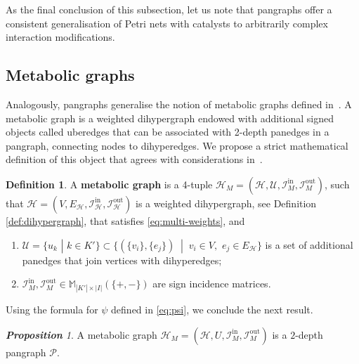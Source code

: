 \documentclass[a4paper,12pt]{article}
\theoremstyle{definition}
\newtheorem{definition}{Definition}
\theoremstyle{remark}
\newcommand{\mH}{\mathcal{H}}
\newcommand{\mP}{\mathcal{P}}
\newcommand{\EH}{E_{\mathcal{H}}}
\newcommand{\tin}{\mathrm{in}}
\newcommand{\out}{\mathrm{out}}
\newcommand{\inci}{\mathcal{I}^{\tin}}
\newcommand{\inco}{\mathcal{I}^{\out}}
\newtheorem{prop}{\small\bf Proposition}
\begin{document}
As the final conclusion of this subsection, let us note that pangraphs offer a consistent generalisation of Petri nets with catalysts to arbitrarily complex interaction modifications.


\subsection{Metabolic graphs}
Analogously, pangraphs generalise the notion of metabolic graphs defined in~\cite{Metabolic_graphs_McQuade}. A metabolic graph is a weighted dihypergraph endowed with additional signed objects called uberedges that can be associated with 2-depth panedges in a pangraph, connecting nodes to dihyperedges. We propose a strict mathematical definition of this object that agrees with considerations in~\cite{Metabolic_graphs_McQuade}.

\begin{definition}
    A \textbf{metabolic graph} is a 4-tuple $\mathcal{H}_{M}=(\mathcal{H},\mathcal{U}, \inci_M,\inco_M)$, such that $\mathcal{H}=(V,\EH,\inci_\mH,\inco_\mH)$ is a weighted dihypergraph, see Definition \ref{def:dihypergraph}, that satisfies \eqref{eq:multi-weights}, and
    \begin{enumerate}
  \item  $\mathcal{U}=\{u_k\,\,|\,\,k\in K'\}\subset \{(\{v_i\},\{e_j\})\;\;|\;\;v_i\in V,\,\,e_j\in E_{\mH}\}$ is a set of additional panedges that join vertices with dihyperedges;
  
    \item  $\inci_M,\inco_M\in \mathbb{M}_{|K'|\times |I|}(\{+,-\})$ are sign incidence matrices.
        \end{enumerate}
\end{definition}

Using the formula for $\psi$ defined in \eqref{eq:psi}, we conclude the next result. 
\begin{prop}
    A metabolic graph $\mathcal{H}_{M}=(\mathcal{H},U, \inci_M,\inco_M)$ is a $2$-depth pangraph $\mP$.
\end{prop}
\end{document}
